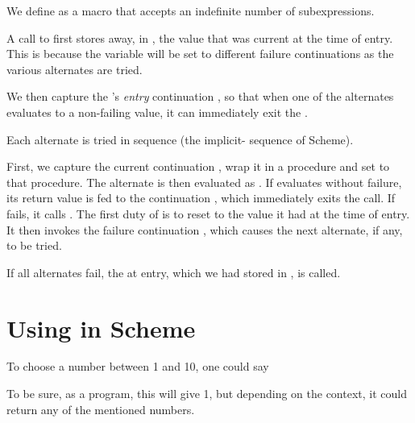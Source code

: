 We define  as a macro that accepts an indefinite
number of subexpressions.


\n A call to  first stores away, in
, the  value that was
current at the time of entry.  This is because the
 variable will be set to different failure
continuations as the various alternates are tried.

We then capture the ’s {\em entry} continuation , so
that when one of the alternates evaluates to a non-failing
value, it can immediately exit the .

Each alternate  is tried in sequence (the
implicit- sequence of Scheme).

First, we capture the current continuation , wrap it
in a procedure and set  to that procedure.  The
alternate is then evaluated as .  If 
evaluates without failure, its return value is fed to the
continuation , which immediately exits the 
call.  If  fails, it calls .  The first
duty of  is to reset  to the value
it had at the time of entry.  It then invokes the failure
continuation , which causes the next alternate, if
any, to be tried.

If all alternates fail, the  at  entry,
which we had stored in , is
called.

\section{Using  in Scheme} 

To choose a number between 1 and 10, one could say


\n To be sure, as a program, this will give 1, but
depending on the context, it could return any of the
mentioned numbers.

